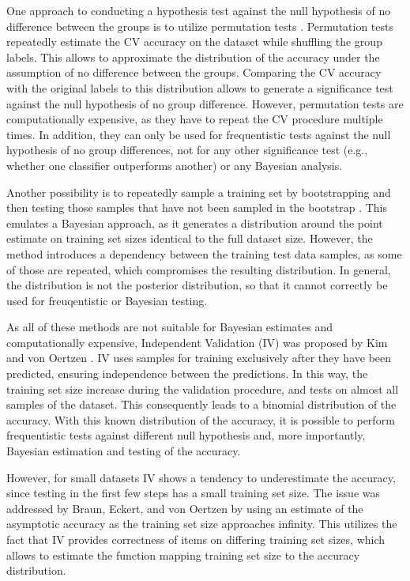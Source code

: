 \documentclass[man]{apa7}
\begin{document}
One approach to conducting a hypothesis test against the null hypothesis of no difference between the groups is to utilize permutation tests \citep{pesarin_permutation_2010}. Permutation tests repeatedly estimate the CV accuracy on the dataset while shuffling the group labels. This allows to approximate the distribution of the accuracy under the assumption of no difference between the groups. Comparing the CV accuracy with the original labels to this distribution allows to generate a significance test against the null hypothesis of no group difference. However, permutation tests are computationally expensive, as they have to repeat the CV procedure multiple times. In addition, they can only be used for frequentistic tests against the null hypothesis of no group differences, not for any other significance test (e.g., whether one classifier outperforms another) or any Bayesian analysis.

Another possibility is to repeatedly sample a training set by bootstrapping and then testing those samples that have not been sampled in the bootstrap \citep{kohavi_study_1995}. This emulates a Bayesian approach, as it generates a distribution around the point estimate on training set sizes identical to the full dataset size. However, the method introduces a dependency between the training test data samples, as some of those are repeated, which compromises the resulting distribution. In general, the distribution is not the posterior distribution, so that it cannot correctly be used for freuqentistic or Bayesian testing.

As all of these methods are not suitable for Bayesian estimates and computationally expensive, Independent Validation (IV) was proposed by Kim and von Oertzen \citep{kim_classifiers_2018}. IV uses samples for training exclusively after they have been predicted, ensuring independence between the predictions. In this way, the training set size increase during the validation procedure, and tests on almost all samples of the dataset. This consequently leads to a binomial distribution of the accuracy. With this known distribution of the accuracy, it is possible to perform frequentistic tests against different null hypothesis and, more importantly, Bayesian estimation and testing of the accuracy.

However, for small datasets IV shows a tendency to underestimate the accuracy, since testing in the first few steps has a small training set size. The issue was addressed by Braun, Eckert, and von Oertzen \citep{braun_independent_2023} by using an estimate of the asymptotic accuracy as the training set size approaches infinity. This utilizes the fact that IV provides correctness of items on differing training set sizes, which allows to estimate the function mapping training set size to the accuracy distribution.
\end{document}
